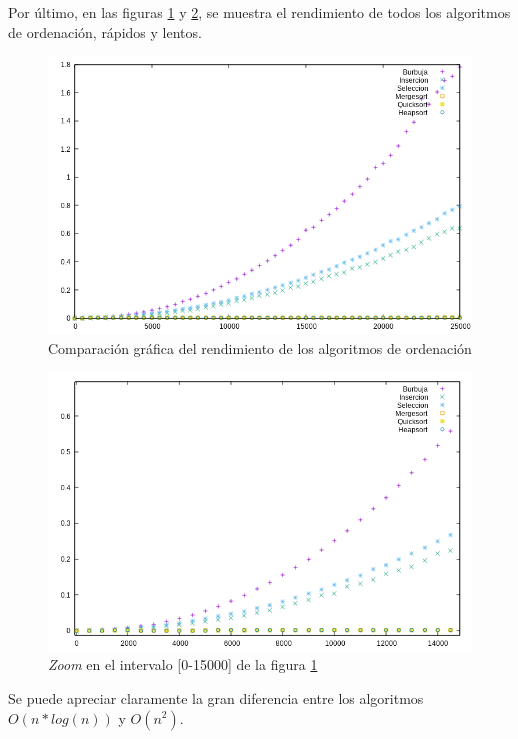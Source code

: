 \documentclass{article}
\begin{document}
Por último, en las figuras \ref{fig:ordenacion} y \ref{fig:ordenacion_zoom}, se muestra el rendimiento de todos los algoritmos de ordenación, rápidos y lentos.
	\begin{figure}[H]
		\centering
		\includegraphics[totalheight=8cm]{img/ordenacion}
		\caption{Comparación gráfica del rendimiento de los algoritmos de ordenación}
		\label{fig:ordenacion}
	\end{figure}
	\begin{figure}[H]
		\centering
		\includegraphics[totalheight=8cm]{img/ordenacion_zoom}
		\caption{\textit{Zoom} en el intervalo [0-15000] de la figura \ref{fig:ordenacion}}
		\label{fig:ordenacion_zoom}
	\end{figure}
Se puede apreciar claramente la gran diferencia entre los algoritmos $O(n*log(n))$ y $O(n^2)$.
\end{document}
